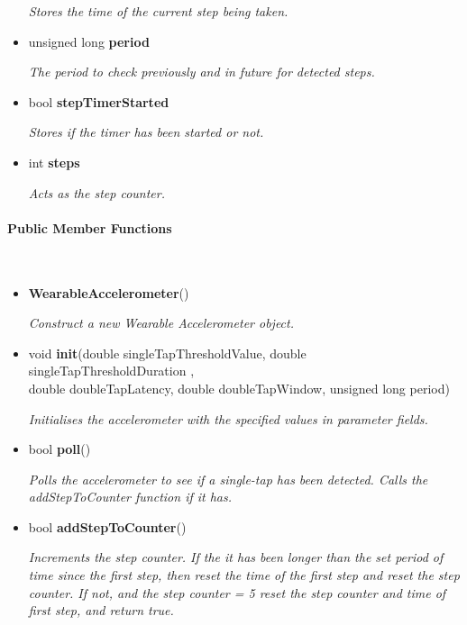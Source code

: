 \begin{itemize}
                \quad \quad \textit{Stores the time of the current step being taken.}

            \item unsigned long \textbf{period}
            
                \quad \quad \textit{The period to check previously and in future for detected steps.}
                
            \item bool \textbf{stepTimerStarted}
            
                \quad \quad \textit{Stores if the timer has been started or not.}
                
            \item int \textbf{steps}
            
                \quad \quad \textit{Acts as the step counter.}\\

        \end{itemize}


    \paragraph{Public Member Functions}\mbox{}\\

        \begin{itemize}
            \item \textbf{WearableAccelerometer}() 
            
                \quad \quad \textit{Construct a new Wearable Accelerometer object.}

            \item void \textbf{init}(double singleTapThresholdValue, double singleTapThresholdDuration
            , \\double doubleTapLatency, double doubleTapWindow, unsigned long period) 
            
                \quad \quad \textit{Initialises the accelerometer with the specified values in parameter fields.}

            \item bool \textbf{poll}() 
            
                \quad \quad \textit{Polls the accelerometer to see if a single-tap has been detected. Calls the addStepToCounter function if it has.}

            \item bool \textbf{addStepToCounter}() 
            
                \quad \quad \textit{Increments the step counter. If the it has been longer than the set period of time since the first step, then reset the time of the first step and reset the step counter. If not, and the step counter = 5 reset the step counter and time of first step, and return true.}\\

        \end{itemize}

